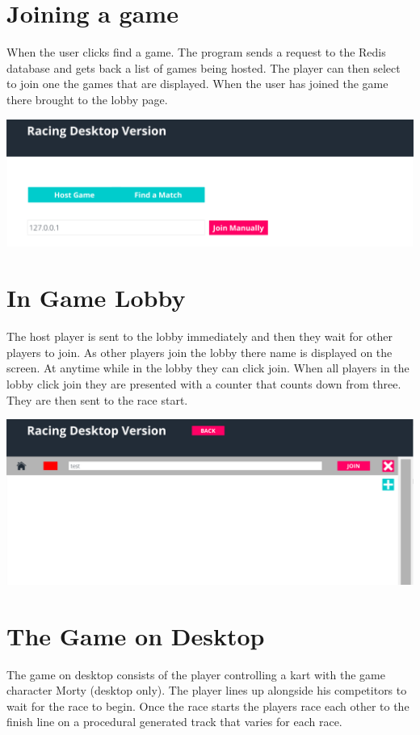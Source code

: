 \section{Joining a game}
When the user clicks find a game. The program sends a request to the Redis database and gets back a list of games being hosted. The player can then select to join one the games that are displayed. When the user has joined the game there brought to the lobby page.
\newline

\includegraphics[width=1\columnwidth]{img/MatchFinder1Actual.PNG}

\section{In Game Lobby}
The host player is sent to the lobby immediately and then they wait for other players to join. As other players join the lobby there name is displayed on the screen. At anytime while in the lobby they can click join. When all players in the lobby click join they are presented with a counter that counts down from three. They are then sent to the race start. \newline

\includegraphics[width=1\columnwidth]{img/LobbyActual.PNG}

\section{The Game on Desktop}
The game on desktop consists of the player controlling a kart with the game character Morty (desktop only). The player lines up alongside his competitors to wait for the race to begin. Once the race starts the players race each other to the finish line on a procedural generated track that varies for each race.\newline

